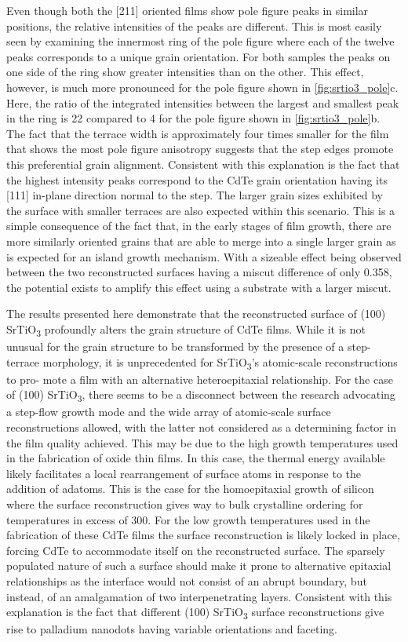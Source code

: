 Even though both the [211] oriented films show pole figure peaks in similar positions, the relative intensities of the peaks are different.
This is most easily seen by examining the innermost ring of the pole figure where each of the twelve peaks corresponds to a unique grain orientation.
For both samples the peaks on one side of the ring show greater intensities than on the other.
This effect, however, is much more pronounced for the pole figure shown in \cref{fig:srtio3_pole}c.
Here, the ratio of the integrated intensities between the largest and smallest peak in the ring is 22 compared to 4 for the pole figure shown in \cref{fig:srtio3_pole}b.
The fact that the terrace width is approximately four times smaller for the film that shows the most pole figure anisotropy suggests that the step edges promote this preferential grain alignment.
Consistent with this explanation is the fact that the highest intensity peaks correspond to the CdTe grain orientation having its [111] in-plane direction normal to the step.
The larger grain sizes exhibited by the surface with smaller terraces are also expected within this scenario.
This is a simple consequence of the fact that, in the early stages of film growth, there are more similarly oriented grains that are able to merge into a single larger grain as is expected for an island growth mechanism.
With a sizeable effect being observed between the two reconstructed surfaces having a miscut difference of only 0.358\degree{}, the potential exists to amplify this effect using a substrate with a larger miscut.

The results presented here demonstrate that the reconstructed surface of (100) SrTiO\textsubscript{3} profoundly alters the grain structure of CdTe films.
While it is not unusual for the grain structure to be transformed by the presence of a step-terrace morphology, it is unprecedented for SrTiO\textsubscript{3}’s atomic-scale reconstructions to pro- mote a film with an alternative heteroepitaxial relationship.
For the case of (100) SrTiO\textsubscript{3}, there seems to be a disconnect between the research advocating a step-flow growth mode and the wide array of atomic-scale surface reconstructions allowed, with the latter not considered as a determining factor in the film quality achieved.
This may be due to the high growth temperatures used in the fabrication of oxide thin films.
In this case, the thermal energy available likely facilitates a local rearrangement of surface atoms in response to the addition of adatoms.
This is the case for the homoepitaxial growth of silicon where the surface reconstruction gives way to bulk crystalline ordering for temperatures in excess of 300\celsius{}\cite{Gossmann1985}.
For the low growth temperatures used in the fabrication of these CdTe films the surface reconstruction is likely locked in place, forcing CdTe to accommodate itself on the reconstructed surface.
The sparsely populated nature of such a surface should make it prone to alternative epitaxial relationships as the interface would not consist of an abrupt boundary, but instead, of an amalgamation of two interpenetrating layers.
Consistent with this explanation is the fact that different (100) SrTiO\textsubscript{3} surface reconstructions give rise to palladium nanodots having variable orientations and faceting\cite{Silly2005b}.
